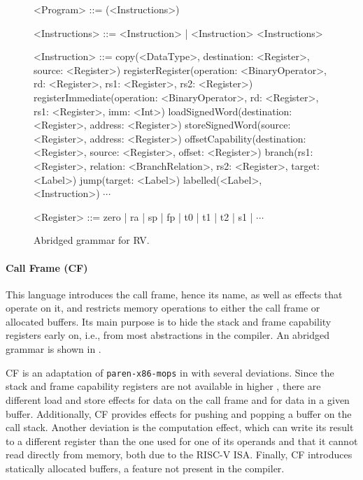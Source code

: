 \documentclass[main.tex]{subfiles}
\begin{document}
\begin{figure}[ht]
	\begin{grammar}
		
		<Program> ::= (<Instructions>)
		
		<Instructions> ::= <Instruction> | <Instruction> <Instructions>
		
		<Instruction> ::= copy(<DataType>, destination: <Register>, source: <Register>)
			\alt registerRegister(operation: <BinaryOperator>, rd: <Register>, rs1: <Register>, rs2: <Register>)
			\alt registerImmediate(operation: <BinaryOperator>, rd: <Register>, rs1: <Register>, imm: <Int>)
			\alt loadSignedWord(destination: <Register>, address: <Register>)
			\alt storeSignedWord(source: <Register>, address: <Register>)
			\alt offsetCapability(destination: <Register>, source: <Register>, offset: <Register>)
			\alt branch(rs1: <Register>, relation: <BranchRelation>, rs2: <Register>, target: <Label>)
			\alt jump(target: <Label>)
			\alt labelled(<Label>, <Instruction>)
			\alt $\cdots$
			
		<Register> ::= zero | ra | sp | fp | t0 | t1 | t2 | s1 | $\cdots$
		
	\end{grammar}
	\caption{Abridged grammar for RV.}
	\label{bnf:rv}
\end{figure}

\paragraph{Call Frame (CF)} This language introduces the call frame, hence its name, as well as effects that operate on it, and restricts memory operations to either the call frame or allocated buffers. Its main purpose is to hide the stack and frame capability registers early on, i.e., from most abstractions in the compiler. An abridged grammar is shown in .

CF is an adaptation of \texttt{paren-x86-mops} in \cite{:compcourse} with several deviations. Since the stack and frame capability registers are not available in higher \ils{}, there are different load and store effects for data on the call frame and for data in a given buffer. Additionally, CF provides effects for pushing and popping a buffer on the call stack. Another deviation is the computation effect, which can write its result to a different register than the one used for one of its operands and that it cannot read directly from memory, both due to the RISC-V ISA. Finally, CF introduces statically allocated buffers, a feature not present in the \cite{:compcourse} compiler.
\end{document}
